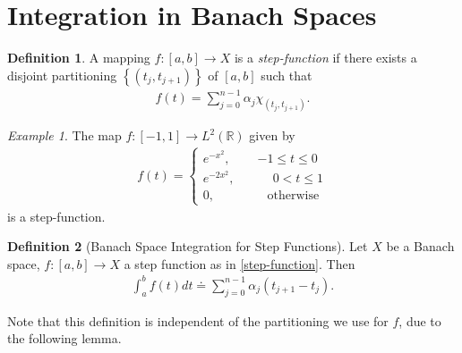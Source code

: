\documentclass[12pt,reqno]{amsart}
\numberwithin{equation}{section}  %
\numberwithin{figure}{section}
\newcommand{\rr}{\mathbb{R}}
\theoremstyle{plain}
\theoremstyle{definition}
\newtheorem{definition}{Definition}
\theoremstyle{remark}
\newtheorem{example}{Example}
\begin{document}
\section{Integration in Banach Spaces}
\label{sec:int-banach}
%
%
%
%
%
%
%
%
%
%
%
%
%
%
%
%
\begin{definition}
	A mapping $f:[a,b] \to X$ is a \emph{step-function} if there exists a disjoint
	partitioning $\left\{ (t_{j}, t_{j+1}) \right\}$ of $[a,b]$ such that
	\begin{equation}
		\label{step-function}
		\begin{split}
			f(t)=\sum_{j=0}^{n-1} {\alpha_j} \chi_{(t_{j}, t_{j+1})}.
		\end{split}
	\end{equation}
\end{definition}
%
%
\begin{framed}
\begin{example}
	The map $f:[-1,1] \to L^2(\rr)$ given by 
	\begin{equation*}
		\begin{split}
			f(t) = 
			\begin{cases}
				 e^{-x^2},  \quad & -1 \le t\le0 \\
				 e^{-2x^2},  \quad & \phantom - 0 < t \le 1 \\
				 0,  \quad & \phantom - \text{otherwise}
			\end{cases}
		\end{split}
	\end{equation*}
	is a step-function.
	\end{example}
\end{framed}
%
%
\begin{definition}[Banach Space Integration for Step Functions]
	Let $X$ be a Banach space, $f: [a,b] \to
	X$ a step function as in \eqref{step-function}. 
	Then 
	\begin{equation*}
		\begin{split}
      \int_a^b f(t) dt \doteq \sum_{j=0}^{n-1} \alpha_j (t_{j+1} - t_{j}).
    \end{split}
	\end{equation*}
%
\end{definition}
%
%
Note that this definition is independent of the partitioning we use for $f$, due
to the following lemma.
\end{document}
